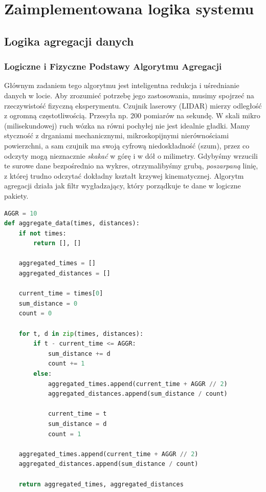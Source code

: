 \documentclass[a4paper,12pt]{article}
\begin{document}
\newpage

\section{Zaimplementowana logika systemu}


\subsection{Logika agregacji danych}

\subsubsection*{Logiczne i Fizyczne Podstawy Algorytmu Agregacji}
Głównym zadaniem tego algorytmu jest inteligentna redukcja i uśrednianie danych w locie. Aby zrozumieć potrzebę jego zastosowania, musimy spojrzeć na rzeczywistość fizyczną eksperymentu.
Czujnik laserowy (LIDAR) mierzy odległość z ogromną częstotliwością. Przesyła np. 200 pomiarów na sekundę. W skali mikro (milisekundowej) ruch wózka na równi pochyłej nie jest idealnie gładki. Mamy styczność z drganiami mechanicznymi, mikroskopijnymi nierównościami powierzchni, a sam czujnik ma swoją cyfrową niedoskładność (szum), przez co odczyty mogą nieznacznie \textit{skakać} w górę i w dół o milimetry.
Gdybyśmy wrzucili te surowe dane bezpośrednio na wykres, otrzymalibyśmy grubą, \textit{poszarpaną} linię, z której trudno odczytać dokładny kształt krzywej kinematycznej. Algorytm agregacji działa jak filtr wygładzający, który porządkuje te dane w logiczne pakiety.

\begin{lstlisting}[language=Python]
AGGR = 10
def aggregate_data(times, distances):
    if not times:
        return [], []

    aggregated_times = []
    aggregated_distances = []

    current_time = times[0]
    sum_distance = 0
    count = 0

    for t, d in zip(times, distances):
        if t - current_time <= AGGR:
            sum_distance += d
            count += 1
        else:
            aggregated_times.append(current_time + AGGR // 2)
            aggregated_distances.append(sum_distance / count)

            current_time = t
            sum_distance = d
            count = 1

    aggregated_times.append(current_time + AGGR // 2)
    aggregated_distances.append(sum_distance / count)

    return aggregated_times, aggregated_distances
\end{lstlisting}
\end{document}
